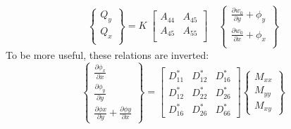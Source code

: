 \documentclass[11pt,letterpaper,titlepage,draft]{article}
\newcommand{\PDer}[2]{\frac{\partial #1}{\partial #2}}
\numberwithin{equation}{subsection}
\begin{document}
\begin{equation}\label{sym_lam_shear_angle}
    \begin{Bmatrix}
    Q_y \\[3pt]
    Q_x \\[3pt]
    \end{Bmatrix}
    =
    K \; 
    \begin{bmatrix}
        A_{44} & A_{45} \\[3pt]
        A_{45} & A_{55} \\[3pt]
    \end{bmatrix}
    \quad
    \begin{Bmatrix}
        \PDer{w_0}{y} + \phi_y \\[3pt]
        \PDer{w_0}{x} + \phi_x \\[3pt]
    \end{Bmatrix}
\end{equation}
To be more useful, these relations are inverted:
\begin{equation}
    \begin{Bmatrix}
    \PDer{\phi_x}{x} \\[3pt]
    \PDer{\phi_y}{y} \\[3pt]
    \PDer{\phi x}{y} + \PDer{\phi y}{x}
    \end{Bmatrix}
    = 
    \begin{bmatrix}
    D_{11}^* & D_{12}^*  & D_{16}^*  \\[3pt]
    D_{12}^*  & D_{22}^*  & D_{26}^*  \\[3pt]
    D_{16}^*  & D_{26}^*  & D_{66}^* 
    \end{bmatrix}
    \begin{Bmatrix}
    M_{xx} \\
    M_{yy} \\
    M_{xy}
    \end{Bmatrix}
\end{equation}
\end{document}

